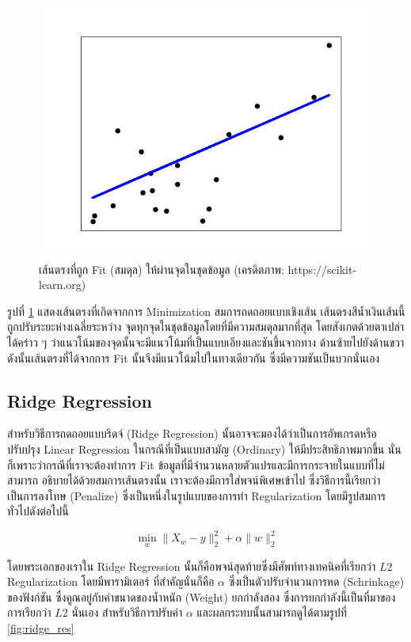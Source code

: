 \begin{figure}[H]
    \centering
    \includegraphics[width=0.8\linewidth]{fig/plot_linear_regression.png}
    \caption{เส้นตรงที่ถูก Fit (สมดุล) ให้ผ่านจุดในชุดข้อมูล (เครดิตภาพ: https://scikit-learn.org)}
    \label{fig:lin_res}
\end{figure}

รูปที่ \ref{fig:lin_res} แสดงเส้นตรงที่เกิดจากการ Minimization สมการถดถอยแบบเชิงเส้น เส้นตรงสีน้ำเงินเส้นนี้ถูกปรับระยะห่างเฉลี่ยระหว่าง%
จุดทุกจุดในชุดข้อมูลโดยที่มีความสมดุลมากที่สุด โดยสังเกตด้วยตาเปล่าได้คร่าว ๆ ว่าแนวโน้มของจุดนั้นจะมีแนวโน้มที่เป็นแบบเอียงและชันขึ้นจากทาง%
ด้านซ้ายไปยังด้านขวา ดังนั้นเส้นตรงที่ได้จากการ Fit นั้นจึงมีแนวโน้มไปในทางเดียวกัน ซึ่งมีความชันเป็นบวกนั่นเอง

\subsection{Ridge Regression}

สำหรับวิธีการถดถอยแบบริดจ์ (Ridge Regression) นั้นอาจจะมองได้ว่าเป็นการอัพเกรดหรือปรับปรุง Linear Regression ในกรณีที่เป็นแบบสามัญ
(Ordinary) ให้มีประสิทธิภาพมากขึ้น นั่นก็เพราะว่ากรณีที่เราจะต้องทำการ Fit ข้อมูลที่มีจำนวนหลายตัวแปรและมีการกระจายในแบบที่ไม่สามารถ%
อธิบายได้ด้วยสมการเส้นตรงนั้น เราจะต้องมีการใส่พจน์พิเศษเข้าไป ซึ่งวิธีการนี้เรียกว่าเป็นการลงโทษ (Penalize) ซึ่งเป็นหนึ่งในรูปแบบของการทำ
Regularization โดยมีรูปสมการทั่วไปดังต่อไปนี้

\begin{equation}
    \min_{w} \lVert X_{w} - y \rVert_{2}^{2} + \alpha \lVert w \rVert_{2}^{2}
\end{equation}

\noindent โดยพระเอกของเราใน Ridge Regression นั้นก็คือพจน์สุดท้ายซึ่งมีศัพท์ทางเทคนิคที่เรียกว่า $L2$ Regularization โดยมีพารามิเตอร์%
ที่สำคัญนั่นก็คือ $\alpha$ ซึ่งเป็นตัวปรับจำนวนการหด (Schrinkage) ของฟังก์ชัน ซึ่งคูณอยู่กับค่าขนาดของน้ำหนัก (Weight) ยกกำลังสอง
ซึ่งการยกกำลังนี้เป็นที่มาของการเรียกว่า $L2$ นั่นเอง สำหรับวิธีการปรับค่า $\alpha$ และผลกระทบนั้นสามารถดูได้ตามรูปที่ \ref{fig:ridge_res}

